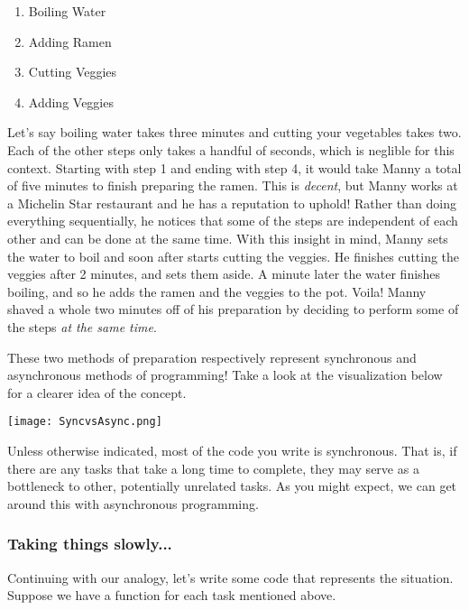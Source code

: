 \begin{enumerate}
    \item Boiling Water
    \item Adding Ramen
    \item Cutting Veggies
    \item Adding Veggies
\end{enumerate}

Let's say boiling water takes three minutes and cutting your vegetables takes two. Each of the other steps only takes a handful of seconds, which is neglible for this context. Starting with step 1 and ending with step 4, it would take Manny a total of five minutes to finish preparing the ramen. This is \emph{decent}, but Manny works at a Michelin Star restaurant and he has a reputation to uphold! Rather than doing everything sequentially, he notices that some of the steps are independent of each other and can be done at the same time. With this insight in mind, Manny sets the water to boil and soon after starts cutting the veggies. He finishes cutting the veggies after 2 minutes, and sets them aside. A minute later the water finishes boiling, and so he adds the ramen and the veggies to the pot. Voila! Manny shaved a whole two minutes off of his preparation by deciding to perform some of the steps \emph{at the same time}. 

These two methods of preparation respectively represent synchronous and asynchronous methods of programming! Take a look at the visualization below for a clearer idea of the concept.

\begin{center}
    \texttt{[image: SyncvsAsync.png]}
\end{center}

Unless otherwise indicated, most of the code you write is synchronous. That is, if there are any tasks that take a long time to complete, they may serve as a bottleneck to other, potentially unrelated tasks. As you might expect, we can get around this with asynchronous programming. 

\subsubsection*{Taking things slowly...}
Continuing with our analogy, let's write some code that represents the situation. Suppose we have a function for each task mentioned above.

